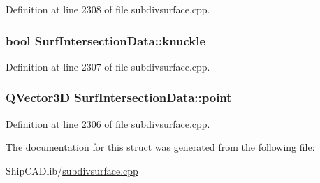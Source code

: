 Definition at line 2308 of file subdivsurface.\+cpp.

\subsubsection[{\texorpdfstring{knuckle}{knuckle}}]{\setlength{\rightskip}{0pt plus 5cm}bool Surf\+Intersection\+Data\+::knuckle}\hypertarget{structSurfIntersectionData_aa0424f338bde27885e800c649d436c52}{}\label{structSurfIntersectionData_aa0424f338bde27885e800c649d436c52}


Definition at line 2307 of file subdivsurface.\+cpp.

\subsubsection[{\texorpdfstring{point}{point}}]{\setlength{\rightskip}{0pt plus 5cm}Q\+Vector3D Surf\+Intersection\+Data\+::point}\hypertarget{structSurfIntersectionData_a789d1758e7035fdf5b902861e936113a}{}\label{structSurfIntersectionData_a789d1758e7035fdf5b902861e936113a}


Definition at line 2306 of file subdivsurface.\+cpp.



The documentation for this struct was generated from the following file\+:\begin{DoxyCompactItemize}
\item 
Ship\+C\+A\+Dlib/\hyperlink{subdivsurface_8cpp}{subdivsurface.\+cpp}\end{DoxyCompactItemize}
